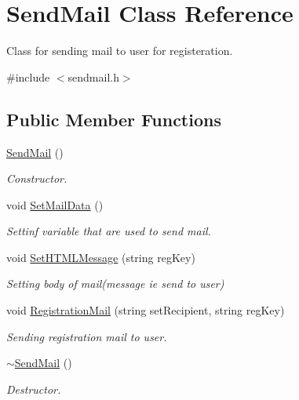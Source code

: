 \hypertarget{classSendMail}{\section{Send\-Mail Class Reference}
\label{classSendMail}
}


Class for sending mail to user for registeration.  




{\ttfamily \#include $<$sendmail.\-h$>$}

\subsection*{Public Member Functions}
\begin{DoxyCompactItemize}
\item 
\hyperlink{classSendMail_ae0d11ddeda1ae7ae1cc3b8f11678ed92}{Send\-Mail} ()
\begin{DoxyCompactList}\small\item\em Constructor. \end{DoxyCompactList}\item 
void \hyperlink{classSendMail_a25ba5afabc97cf3dab525f2eb1e67e0e}{Set\-Mail\-Data} ()
\begin{DoxyCompactList}\small\item\em Settinf variable that are used to send mail. \end{DoxyCompactList}\item 
void \hyperlink{classSendMail_a6db554f5547ff82a533547d3710308b3}{Set\-H\-T\-M\-L\-Message} (string reg\-Key)
\begin{DoxyCompactList}\small\item\em Setting body of mail(message ie send to user) \end{DoxyCompactList}\item 
void \hyperlink{classSendMail_a4c9983852dbcd1eb07170582761ed559}{Registration\-Mail} (string set\-Recipient, string reg\-Key)
\begin{DoxyCompactList}\small\item\em Sending registration mail to user. \end{DoxyCompactList}\item 
\hyperlink{classSendMail_acc86b2a9995472436dbd77b3c6bb91f3}{$\sim$\-Send\-Mail} ()
\begin{DoxyCompactList}\small\item\em Destructor. \end{DoxyCompactList}\end{DoxyCompactItemize}
